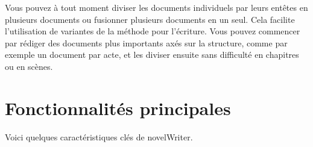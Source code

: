 \documentclass[a4paper,11pt,french]{sphinxmanual}
\begin{document}
\sphinxAtStartPar
Vous pouvez à tout moment diviser les documents individuels par leurs en\sphinxhyphen{}têtes en plusieurs documents ou fusionner plusieurs documents en un seul. Cela facilite l’utilisation de variantes de la méthode  pour l’écriture. Vous pouvez commencer par rédiger des documents plus importants axés sur la structure, comme par exemple un document par acte, et les diviser ensuite sans difficulté en chapitres ou en scènes.


\section{Fonctionnalités principales}
\label{\detokenize{int_introduction:key-features}}\label{\detokenize{int_introduction:a-intro-features}}
\sphinxAtStartPar
Voici quelques caractéristiques clés de novelWriter.
\end{document}
